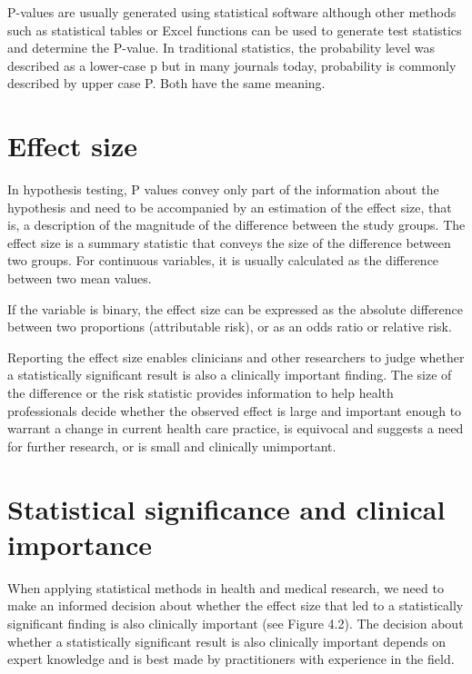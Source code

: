 \documentclass[
]{memoir}
\begin{document}
P-values are usually generated using statistical software although other methods such as statistical tables or Excel functions can be used to generate test statistics and determine the P-value. In traditional statistics, the probability level was described as a lower-case p but in many journals today, probability is commonly described by upper case P. Both have the same meaning.

\hypertarget{effect-size}{%
\section{Effect size}\label{effect-size}}

In hypothesis testing, P values convey only part of the information about the hypothesis and need to be accompanied by an estimation of the effect size, that is, a description of the magnitude of the difference between the study groups. The effect size is a summary statistic that conveys the size of the difference between two groups. For continuous variables, it is usually calculated as the difference between two mean values.

If the variable is binary, the effect size can be expressed as the absolute difference between two proportions (attributable risk), or as an odds ratio or relative risk.

Reporting the effect size enables clinicians and other researchers to judge whether a statistically significant result is also a clinically important finding. The size of the difference or the risk statistic provides information to help health professionals decide whether the observed effect is large and important enough to warrant a change in current health care practice, is equivocal and suggests a need for further research, or is small and clinically unimportant.

\hypertarget{statistical-significance-and-clinical-importance}{%
\section{Statistical significance and clinical importance}\label{statistical-significance-and-clinical-importance}}

When applying statistical methods in health and medical research, we need to make an informed decision about whether the effect size that led to a statistically significant finding is also clinically important (see Figure 4.2). The decision about whether a statistically significant result is also clinically important depends on expert knowledge and is best made by practitioners with experience in the field.
\end{document}
